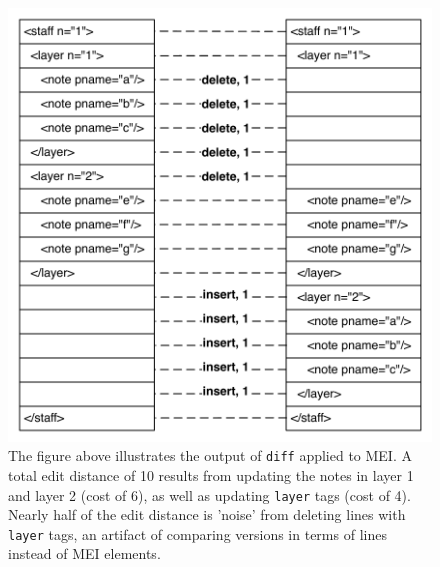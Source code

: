 \documentclass{article}
\newcommand{\code}[1]{\texttt{#1}}
\begin{document}
\begin{figure}[ht]
\centering
\includegraphics[scale=0.5]{figures/lcs-diff.pdf}
\caption{The figure above illustrates the output of \code{diff}
  applied to MEI.  A total edit distance of 10 results from updating
  the notes in layer 1 and layer 2 (cost of 6), as well as updating
  \code{layer} tags (cost of 4).  Nearly half of the edit distance is
  'noise' from deleting lines with \code{layer} tags, an artifact of
  comparing versions in terms of lines instead of MEI elements.}
\label{fig:lcs-diff}
\end{figure}
\end{document}
